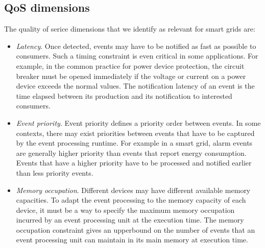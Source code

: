 \subsection{QoS dimensions}
The quality of serice dimensions that we identify as relevant for smart grids are:
\begin{itemize}
 \item \textit{Latency}. Once detected, events may have to be notified as fast as possible to consumers. Such a timing constraint is even critical in some applications. For example, in the common practice for power device protection, the circuit breaker must be opened immediately if the voltage or current on a power device exceeds the normal values. The notification latency of an event is the time elapsed between its production and its notification to interested consumers.

 \item \textit{Event priority}. Event priority defines a priority order between events. In some contexts, there may exist priorities between events that have to be captured by the event processing runtime. For example in a smart grid, alarm events are generally higher priority than events that report energy consumption. Events that have a higher priority have to be processed and notified earlier than less priority events.

 \item \textit{Memory occupation}. Different devices may have different available memory capacities. To adapt the event processing to the memory capacity of each device, it must be a way to specify the maximum memory occupation incurred by an event processing unit at the execution time. The memory occupation constraint gives an upperbound on the number of events that an event processing unit can maintain in its main memory at execution time.
\end{itemize}

